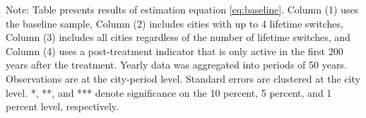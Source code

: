 \begin{table}[htbp]
\begin{tabular}{lcccc}
      
   \end{tabular}
   
   \par \raggedright 
   Note: Table presents results of estimation equation \eqref{eq:baseline}. Column (1) uses the baseline sample, Column (2) includes cities with up to 4 lifetime switches, Column (3) includes all cities regardless of the number of lifetime switches, and Column (4) uses a post-treatment indicator that is only active in the first 200 years after the treatment. Yearly data was aggregated into periods of 50 years. Observations are at the city-period level. Standard errors are  clustered at the city level. *, **, and *** denote significance on the 10 percent, 5 percent, and 1 percent  level, respectively.
\end{table}

